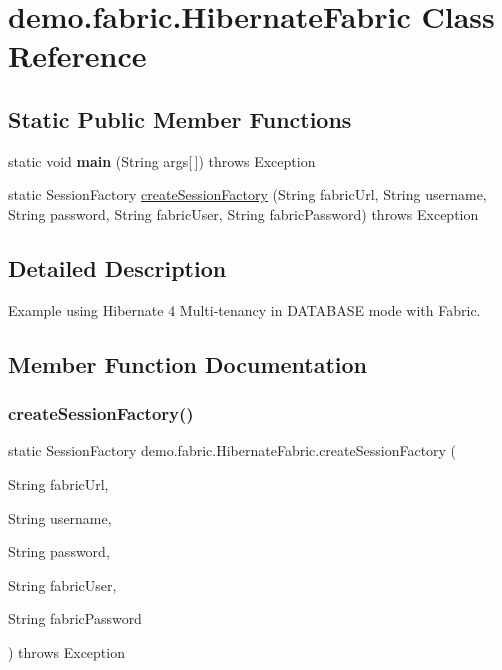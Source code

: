 \hypertarget{classdemo_1_1fabric_1_1_hibernate_fabric}{}\section{demo.\+fabric.\+Hibernate\+Fabric Class Reference}
\label{classdemo_1_1fabric_1_1_hibernate_fabric}
\subsection*{Static Public Member Functions}
\begin{DoxyCompactItemize}
\item 
\mbox{\label{classdemo_1_1fabric_1_1_hibernate_fabric_ad3e58d6bcd117b44a4dfe0176d3d2a45}} 
static void {\bfseries main} (String args\mbox{[}$\,$\mbox{]})  throws Exception 
\item 
static Session\+Factory \mbox{\hyperlink{classdemo_1_1fabric_1_1_hibernate_fabric_a1d64461dd30035745b6dcd5fdc972ab5}{create\+Session\+Factory}} (String fabric\+Url, String username, String password, String fabric\+User, String fabric\+Password)  throws Exception 
\end{DoxyCompactItemize}


\subsection{Detailed Description}
Example using Hibernate 4 Multi-\/tenancy in D\+A\+T\+A\+B\+A\+SE mode with Fabric. 

\subsection{Member Function Documentation}
\mbox{\label{classdemo_1_1fabric_1_1_hibernate_fabric_a1d64461dd30035745b6dcd5fdc972ab5}} 
\subsubsection{\texorpdfstring{create\+Session\+Factory()}{createSessionFactory()}}
{\footnotesize\ttfamily static Session\+Factory demo.\+fabric.\+Hibernate\+Fabric.\+create\+Session\+Factory (\begin{DoxyParamCaption}\item[{String}]{fabric\+Url,  }\item[{String}]{username,  }\item[{String}]{password,  }\item[{String}]{fabric\+User,  }\item[{String}]{fabric\+Password }\end{DoxyParamCaption}) throws Exception\hspace{0.3cm}{\ttfamily [static]}}

